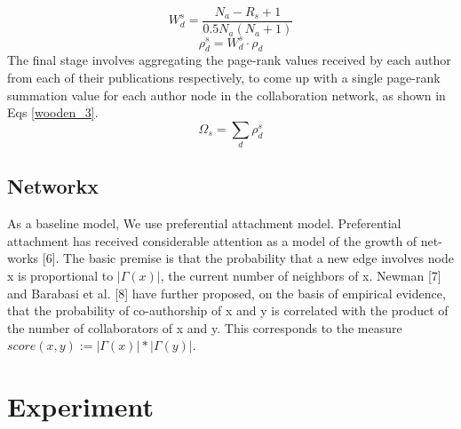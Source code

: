 \documentclass[conference]{IEEEtran}
\begin{document}
\begin{equation}
W_d^s = \frac{N_a-R_s +1}{0.5N_a(N_a+1)}
\label{wooden_1}
\end{equation}
\begin{equation}
	\rho_d^s = W_d^s \cdot \rho_d
\label{wooden_2}
\end{equation}
The final stage involves aggregating the page-rank values received by each author from each of their publications respectively, to come up with a single page-rank summation value for each author node in the collaboration network, as shown in Eqs \ref{wooden_3}.
\begin{equation}
\Omega_s =\sum_d \rho_d^s 
\label{wooden_3}
\end{equation}
\subsection{Networkx}
As a baseline model, We use preferential attachment model. Preferential attachment has received considerable attention as a model of the growth of net-works [6]. The basic premise is that the probability that a new edge involves node x is proportional to $|\Gamma(x)|$, the current number of neighbors of x. Newman [7] and Barabasi et al. [8] have further proposed, on the basis of empirical evidence, that the probability of co-authorship of x and y is correlated with the product of the number of collaborators of x and y. This corresponds to the measure $score(x, y) := |\Gamma(x)|*|\Gamma(y)|$. 
\section{Experiment}
\end{document}
